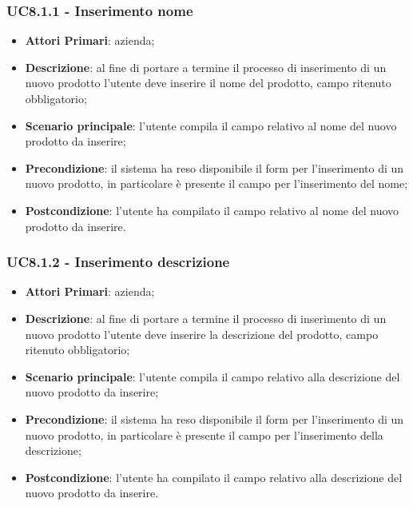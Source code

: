 \subsubsection{UC8.1.1 - Inserimento nome}
\begin{itemize}
	\item \textbf{Attori Primari}: azienda;
	\item \textbf{Descrizione}: al fine di portare a termine il processo di inserimento di un nuovo prodotto l'utente deve inserire il nome del prodotto, campo ritenuto obbligatorio;
	\item \textbf{Scenario principale}: l'utente compila il campo relativo al nome del nuovo prodotto da inserire;
	\item \textbf{Precondizione}: il sistema ha reso disponibile il form per l'inserimento di un nuovo prodotto, in particolare è presente il campo per l'inserimento del nome;
	\item \textbf{Postcondizione}: l'utente ha compilato il campo relativo al nome del nuovo prodotto da inserire.
\end{itemize}
\subsubsection{UC8.1.2 - Inserimento descrizione}
\begin{itemize}
	\item \textbf{Attori Primari}: azienda;
	\item \textbf{Descrizione}: al fine di portare a termine il processo di inserimento di un nuovo prodotto l'utente deve inserire la descrizione del prodotto, campo ritenuto obbligatorio;
	\item \textbf{Scenario principale}: l'utente compila il campo relativo alla descrizione del nuovo prodotto da inserire;
	\item \textbf{Precondizione}: il sistema ha reso disponibile il form per l'inserimento di un nuovo prodotto, in particolare è presente il campo per l'inserimento della descrizione;
	\item \textbf{Postcondizione}: l'utente ha compilato il campo relativo alla descrizione del nuovo prodotto da inserire.
\end{itemize}
